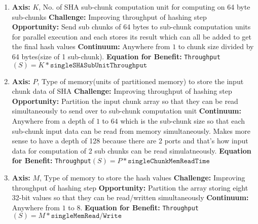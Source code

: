 \documentclass{article}
\begin{document}
\begin{enumerate}
\begin{enumerate}
\item%

\textbf{Axis:} $K$, No. of SHA sub-chunk computation unit for computing on 64 byte sub-chunks
\newline
\textbf{Challenge:} Improving throughput of hashing step
\newline
\textbf{Opportunity:} Send sub chunks of 64 bytes to sub-chunk computation units for parallel execution and each stores its result which can all be added to get the final hash values
\newline
\textbf{Continuum:} Anywhere from $1$ to chunk size divided by 64 bytes(size of 1 sub-chunk).  
\newline
\textbf{Equation for Benefit:} \texttt{Throughput}$\left(S\right)=K*\texttt{singleSHASubUnitThroughput}$

\item%

\textbf{Axis:} $P$, Type of memory(units of partitioned memory) to store the input chunk data of SHA
\newline
\textbf{Challenge:} Improving throughput of hashing step
\newline
\textbf{Opportunity:} Partition the input chunk array so that they can be read simultaneously to send over to sub-chunk computation unit
\newline
\textbf{Continuum:} Anywhere from a depth of $1$ to $64$ which is the sub-chunk size so that each sub-chunk input data can be read from memory simultaneously. Makes more sense to have a depth of 128 because there are 2 ports and that's how input data for computation of 2 sub chunks can be read simulatneously.    
\newline
\textbf{Equation for Benefit:} \texttt{Throughput}$\left(S\right)=P*\texttt{singleChunkMemReadTime}$

\item%

\textbf{Axis:} $M$, Type of memory to store the hash values  
\newline
\textbf{Challenge:} Improving throughput of hashing step
\newline
\textbf{Opportunity:} Partition the array storing eight 32-bit values so that they can be read/written simultaneously
\newline
\textbf{Continuum:} Anywhere from $1$ to $8$.  
\newline
\textbf{Equation for Benefit:} \texttt{Throughput}$\left(S\right)=M*\texttt{singleMemRead/Write}$


\end{enumerate}
\end{enumerate}
\end{document}
